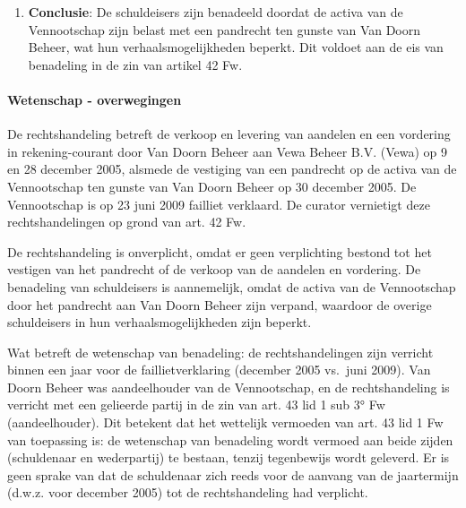 \documentclass[
  dutch,
  a4paper,
]{article}
\providecommand{\tightlist}{%
  \setlength{\itemsep}{0pt}\setlength{\parskip}{0pt}}
\begin{document}
\begin{enumerate}
  \begin{itemize}
  \tightlist
  \item
    Door de overdracht van de vordering en de vestiging van het pandrecht zijn de activa van de Vennootschap (debiteuren en inventaris) belast met een zekerheidsrecht ten gunste van Van Doorn Beheer. Dit betekent dat andere schuldeisers van de Vennootschap zich niet meer onbeperkt op deze activa kunnen verhalen. De verhaalsmogelijkheden voor de overige schuldeisers zijn hierdoor verminderd, wat neerkomt op benadeling in de zin van artikel 42 Fw.
  \item
    De benadeling is aanwezig op het moment waarop de curator zijn rechten doet gelden (leer van de middellijke benadeling), omdat de activa van de Vennootschap nu belast zijn met een pandrecht dat de verhaalsmogelijkheden voor andere schuldeisers beperkt.
  \end{itemize}
\item
  \textbf{Conclusie}:
  De schuldeisers zijn benadeeld doordat de activa van de Vennootschap zijn belast met een pandrecht ten gunste van Van Doorn Beheer, wat hun verhaalsmogelijkheden beperkt. Dit voldoet aan de eis van benadeling in de zin van artikel 42 Fw.
\end{enumerate}

\paragraph{Wetenschap - overwegingen}\label{wetenschap---overwegingen-6}

De rechtshandeling betreft de verkoop en levering van aandelen en een vordering in rekening-courant door Van Doorn Beheer aan Vewa Beheer B.V. (Vewa) op 9 en 28 december 2005, alsmede de vestiging van een pandrecht op de activa van de Vennootschap ten gunste van Van Doorn Beheer op 30 december 2005. De Vennootschap is op 23 juni 2009 failliet verklaard. De curator vernietigt deze rechtshandelingen op grond van art. 42 Fw.

De rechtshandeling is onverplicht, omdat er geen verplichting bestond tot het vestigen van het pandrecht of de verkoop van de aandelen en vordering. De benadeling van schuldeisers is aannemelijk, omdat de activa van de Vennootschap door het pandrecht aan Van Doorn Beheer zijn verpand, waardoor de overige schuldeisers in hun verhaalsmogelijkheden zijn beperkt.

Wat betreft de wetenschap van benadeling: de rechtshandelingen zijn verricht binnen een jaar voor de faillietverklaring (december 2005 vs.~juni 2009). Van Doorn Beheer was aandeelhouder van de Vennootschap, en de rechtshandeling is verricht met een gelieerde partij in de zin van art. 43 lid 1 sub 3° Fw (aandeelhouder). Dit betekent dat het wettelijk vermoeden van art. 43 lid 1 Fw van toepassing is: de wetenschap van benadeling wordt vermoed aan beide zijden (schuldenaar en wederpartij) te bestaan, tenzij tegenbewijs wordt geleverd. Er is geen sprake van dat de schuldenaar zich reeds voor de aanvang van de jaartermijn (d.w.z. voor december 2005) tot de rechtshandeling had verplicht.
\end{document}
